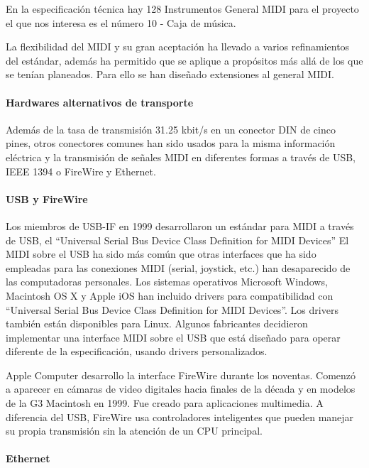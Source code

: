 \documentclass[a4paper,11pt,oneside]{book}
\begin{document}
En la especificación técnica hay 128 Instrumentos General MIDI para el proyecto el que nos interesa es el número 10 - Caja de música.

La flexibilidad del MIDI y su gran aceptación ha llevado a varios refinamientos del estándar, además ha permitido que se aplique a propósitos más allá de los que se tenían planeados. Para ello se han diseñado extensiones al general MIDI.

\paragraph{Hardwares alternativos de transporte}

Además de la tasa de transmisión 31.25 kbit/s en un conector DIN de cinco pines, otros conectores comunes han sido usados para la misma información eléctrica y la transmisión de señales MIDI en diferentes formas a través de USB, IEEE 1394 o FireWire y Ethernet.


\paragraph{USB y FireWire}


Los miembros de USB-IF en 1999 desarrollaron un estándar para MIDI a través de USB, el ``Universal Serial Bus Device Class Definition for MIDI Devices'' El MIDI sobre el USB ha sido más común que otras interfaces que ha sido empleadas para las conexiones MIDI (serial, joystick, etc.) han desaparecido de las computadoras personales. 
Los sistemas operativos Microsoft Windows, Macintosh OS X y Apple iOS han incluido drivers para compatibilidad con ``Universal Serial Bus Device Class Definition for MIDI Devices''. Los drivers también están disponibles para Linux. Algunos fabricantes decidieron implementar una interface MIDI sobre el USB que está diseñado para operar diferente de la especificación, usando drivers personalizados.

Apple Computer desarrollo la interface FireWire durante los noventas. Comenzó a aparecer en cámaras de video digitales hacia finales de la década y en modelos de la G3 Macintosh en 1999. Fue creado para aplicaciones multimedia. A diferencia del USB, FireWire usa controladores inteligentes que pueden manejar su propia transmisión sin la atención de un CPU principal.

\paragraph{Ethernet}
\end{document}
